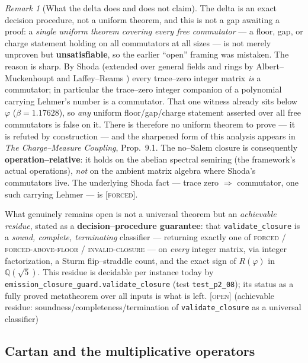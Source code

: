 \documentclass[11pt]{article}
\theoremstyle{plain}
\theoremstyle{definition}
\theoremstyle{remark}
\newtheorem{remark}[theorem]{Remark}
\newcommand{\forced}{\textcolor{forcedc}{\textsc{[forced]}}}
\newcommand{\openq}{\textcolor{openc}{\textsc{[open]}}}
\newcommand{\Q}{\mathbb{Q}}
\begin{document}
\begin{remark}[What the delta does and does not claim]\label{rem:deltaclaim}
The delta is an exact decision procedure, not a uniform theorem, and this is not a gap awaiting a proof: a \emph{single uniform theorem covering every free commutator} --- a floor, gap, or charge statement holding on all commutators at all sizes --- is not merely unproven but \textbf{unsatisfiable}, so the earlier ``open'' framing was mistaken. The reason is sharp. By Shoda \cite{Shoda} (extended over general fields and rings by Albert--Muckenhoupt \cite{AlbertMuckenhoupt} and Laffey--Reams \cite{LaffeyReams}) every trace--zero integer matrix \emph{is} a commutator; in particular the trace--zero integer companion of a polynomial carrying Lehmer's number is a commutator. That one witness already sits below $\varphi$ ($\beta=1.17628$), so \emph{any} uniform floor/gap/charge statement asserted over all free commutators is false on it. There is therefore no uniform theorem to prove --- it is refuted by construction --- and the sharpened form of this analysis appears in \emph{The Charge--Measure Coupling}, Prop.~9.1. The no--Salem closure is consequently \textbf{operation--relative}: it holds on the abelian spectral semiring (the framework's actual operations), \emph{not} on the ambient matrix algebra where Shoda's commutators live. The underlying Shoda fact --- trace zero $\Rightarrow$ commutator, one such carrying Lehmer --- is \forced.

\smallskip\noindent What genuinely remains open is not a universal theorem but an \emph{achievable residue}, stated as a \textbf{decision--procedure guarantee}: that \texttt{validate\_closure} is a \emph{sound, complete, terminating} classifier --- returning exactly one of \textsc{forced} / \textsc{forced-above-floor} / \textsc{invalid-closure} --- on \emph{every} integer matrix, via integer factorization, a Sturm flip--straddle count, and the exact sign of $R(\varphi)$ in $\Q(\sqrt5)$. This residue is decidable per instance today by \texttt{emission\_closure\_guard.validate\_closure} (test \texttt{test\_p2\_08}); its status as a fully proved metatheorem over all inputs is what is left. \openq{} (achievable residue: soundness/completeness/termination of \texttt{validate\_closure} as a universal classifier)
\end{remark}

\subsection{Cartan and the multiplicative operators}\label{sec:cartanmult}
\end{document}
